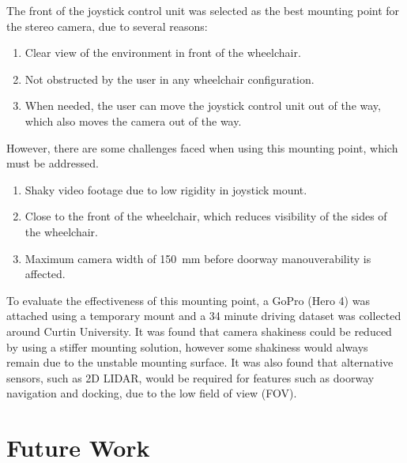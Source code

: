 \documentclass[12pt]{article}
\begin{document}
The front of the joystick control unit was selected as the best mounting point for the
stereo camera, due to several reasons:
\begin{enumerate}
    \item Clear view of the environment in front of the wheelchair.
    \item Not obstructed by the user in any wheelchair configuration.
    \item When needed, the user can move the joystick control unit out of the way,
            which also moves the camera out of the way.
\end{enumerate}
However, there are some challenges faced when using this mounting point, which must be addressed.
\begin{enumerate}
    \item Shaky video footage due to low rigidity in joystick mount.
    \item Close to the front of the wheelchair, which reduces visibility of the sides of the wheelchair.
    \item Maximum camera width of \SI{150}{\milli\metre} before doorway manouverability is affected.
\end{enumerate}

To evaluate the effectiveness of this mounting point, a GoPro (Hero 4) was attached
using a temporary mount and a 34 minute driving dataset was collected around Curtin University.
It was found that camera shakiness could be reduced by using a stiffer mounting solution,
however some shakiness would always remain due to the unstable mounting surface.
It was also found that alternative sensors, such as 2D LIDAR, would be required for features such as doorway
navigation and docking, due to the low field of view (FOV).

\pagebreak

\section{Future Work}
\pagebreak

\printbibliography[heading=bibnumbered]
\end{document}
